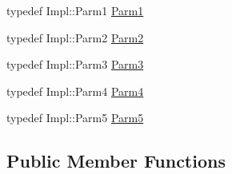 \begin{DoxyCompactItemize}
\item 
typedef Impl\+::\+Parm1 \mbox{\hyperlink{classUtil_1_1ObjectFunctor_a199715d28029627c2ae7219c13b04d26}{Parm1}}
\item 
typedef Impl\+::\+Parm2 \mbox{\hyperlink{classUtil_1_1ObjectFunctor_a6809cf65883dc7575e01d9b9849649cf}{Parm2}}
\item 
typedef Impl\+::\+Parm3 \mbox{\hyperlink{classUtil_1_1ObjectFunctor_a6becd26610c6091b9ba93cd96f3def66}{Parm3}}
\item 
typedef Impl\+::\+Parm4 \mbox{\hyperlink{classUtil_1_1ObjectFunctor_a54ce0b64981cd7f558ce8eea7df3f1b2}{Parm4}}
\item 
typedef Impl\+::\+Parm5 \mbox{\hyperlink{classUtil_1_1ObjectFunctor_a8428e04dd3fb91bc7f7c518a1771eecb}{Parm5}}
\end{DoxyCompactItemize}
\subsection*{Public Member Functions}
